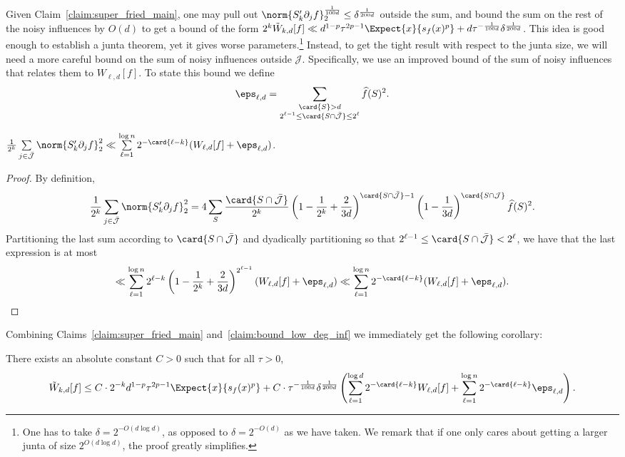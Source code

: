 Given Claim~\ref{claim:super_fried_main}, one may pull out $\norm{S_k' \partial_j f}_2^{\frac{1}{100 d}}\leq \delta^{\frac{1}{200d}}$ outside
the sum, and bound the sum on the rest of the noisy influences by $O(d)$ to get a bound of the form
$2^k \tilde{W}_{k,d}[f]\ll d^{1-p}\tau^{2p-1} \Expect{x}{s_f(x)^p} + d\tau^{-\frac{1}{100 d}}\delta^{\frac{1}{200d}}$.
This idea is good enough to establish a junta theorem, yet it gives worse parameters.\footnote{One has to take
$\delta = 2^{-O(d\log d)}$, as opposed to $\delta = 2^{-O(d)}$ as we have taken. We remark that if one only cares
about getting a larger junta of size $2^{O(d\log d)}$, the proof greatly simplifies.} Instead, to get the tight result with respect
to the junta size, we will need a more careful bound on the sum of noisy influences outside $\mathcal{J}$. Specifically,
we use an improved bound of the sum of noisy influences that relates them to $W_{\ell,d}[f]$.
To state this bound we define
\[
\eps_{\ell,d} = \sum\limits_{\substack{\card{S}>d\\ 2^{\ell-1}\leq \card{S\cap \bar{\mathcal{J}}}\leq 2^{\ell}}} \widehat{f}(S)^2.
\]
 \begin{claim}\label{claim:bound_low_deg_inf}
    $\frac{1}{2^k}\sum\limits_{j\in\bar{\mathcal{J}}} \norm{S_k' \partial_j f}_2^{2}\ll \sum\limits_{\ell=1}^{\log n} 2^{-\card{\ell-k}}(W_{\ell,d}[f]+\eps_{\ell, d})$.
  \end{claim}
  \begin{proof}
    By definition,
    \[
    \frac{1}{2^k}\sum\limits_{j\in\bar{\mathcal{J}}} \norm{S_k' \partial_j f}_2^{2}
    =4\sum\limits_{S} \frac{\card{S\cap \bar{\mathcal{J}}}}{2^k} \left(1-\frac{1}{2^k}+\frac{2}{3d}\right)^{\card{S\cap \bar{\mathcal{J}}}-1}\left(1-\frac{1}{3d}\right)^{\card{S\cap \mathcal{J}}}\widehat{f}(S)^2.
    \]
    Partitioning the last sum according to $\card{S\cap \bar{\mathcal{J}}}$ and dyadically partitioning so that $2^{\ell-1}\leq \card{S\cap \bar{\mathcal{J}}} < 2^{\ell}$, we have that the last
    expression is at most
    \[
    \ll
    \sum\limits_{\ell=1}^{\log n} 2^{\ell-k} \left(1-\frac{1}{2^k}+\frac{2}{3d}\right)^{2^{\ell-1}}(W_{\ell,d}[f]+\eps_{\ell, d})
    \ll
    \sum\limits_{\ell=1}^{\log n} 2^{-\card{\ell-k}}(W_{\ell,d}[f]+\eps_{\ell, d}).\qedhere
    \]
  \end{proof}

    Combining Claims~\ref{claim:super_fried_main} and~\ref{claim:bound_low_deg_inf} we immediately get the following corollary:
\begin{corollary}\label{corr:bound_low_deg_inf}
  There exists an absolute constant $C>0$ such that for all $\tau>0$,
    \[
    \tilde{W}_{k,d}[f]\leq C\cdot 2^{-k} d^{1-p}\tau^{2p-1} \Expect{x}{s_f(x)^p}
    +C\cdot \tau^{-\frac{1}{100 d}}\delta^{\frac{1}{200 d}}
    \left(\sum\limits_{\ell=1}^{\log d} 2^{-\card{\ell-k}}W_{\ell,d}[f]+\sum\limits_{\ell=1}^{\log n} 2^{-\card{\ell-k}}\eps_{\ell, d}\right).
    \]
\end{corollary}


